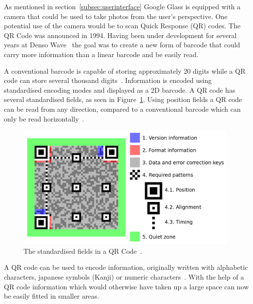 As mentioned in section~\ref{subsec:userinterface} Google Glass is equipped with a camera that could be used to take photos from the user's perspective. One potential use of the camera would be to scan Quick Response (QR) codes. The QR Code was announced in 1994. Having been under development for several years at Denso Wave~\cite{qrCodeHistory} the goal was to create a new form of barcode that could carry more information than a linear barcode and be easily read.

A conventional barcode is capable of storing approximately 20 digits while a QR code can store several thousand digits~\cite{qrCodeType}. Information is encoded using standardised encoding modes and displayed as a 2D barcode. A QR code has several standardised fields, as seen in Figure~\ref{qrcodestandard}. Using position fields a QR code can be read from any direction, compared to a conventional barcode which can only be read horizontally~\cite{qrCodeAbout}.

	\begin{figure}[ht!]
		\centering
		\includegraphics[width=110mm]{images/qrcodestandard}
		\caption{The standardised fields in a QR Code~\cite{qrCodeWiki}.}
		\label{qrcodestandard}
	\end{figure}
	 
A QR code can be used to encode information, originally written with alphabetic characters, japanese symbols (Kanji) or numeric characters~\cite{qrCodeVersion}. With the help of a QR code information which would otherwise have taken up a large space can now be easily fitted in smaller areas.